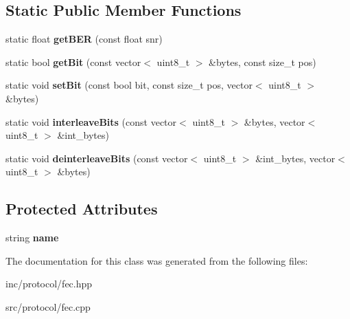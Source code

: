 \subsection*{Static Public Member Functions}
\begin{DoxyCompactItemize}
\item 
\mbox{\label{classFEC_aaf1d4259c61fe117e086ad07871d22a3}} 
static float {\bfseries get\+B\+ER} (const float snr)
\item 
\mbox{\label{classFEC_a92c9959e49decd014767e50404b7d168}} 
static bool {\bfseries get\+Bit} (const vector$<$ uint8\+\_\+t $>$ \&bytes, const size\+\_\+t pos)
\item 
\mbox{\label{classFEC_aa04c28eb445a68ef068632734126529c}} 
static void {\bfseries set\+Bit} (const bool bit, const size\+\_\+t pos, vector$<$ uint8\+\_\+t $>$ \&bytes)
\item 
\mbox{\label{classFEC_a485fba806c7ca5fe2834e97e21aae0d5}} 
static void {\bfseries interleave\+Bits} (const vector$<$ uint8\+\_\+t $>$ \&bytes, vector$<$ uint8\+\_\+t $>$ \&int\+\_\+bytes)
\item 
\mbox{\label{classFEC_ae2d118ea33372eae137b01915b465b3f}} 
static void {\bfseries deinterleave\+Bits} (const vector$<$ uint8\+\_\+t $>$ \&int\+\_\+bytes, vector$<$ uint8\+\_\+t $>$ \&bytes)
\end{DoxyCompactItemize}
\subsection*{Protected Attributes}
\begin{DoxyCompactItemize}
\item 
\mbox{\label{classFEC_abb6d143bc35d00ea0d302b1f70af9851}} 
string {\bfseries name}
\end{DoxyCompactItemize}


The documentation for this class was generated from the following files\+:\begin{DoxyCompactItemize}
\item 
inc/protocol/fec.\+hpp\item 
src/protocol/fec.\+cpp\end{DoxyCompactItemize}

